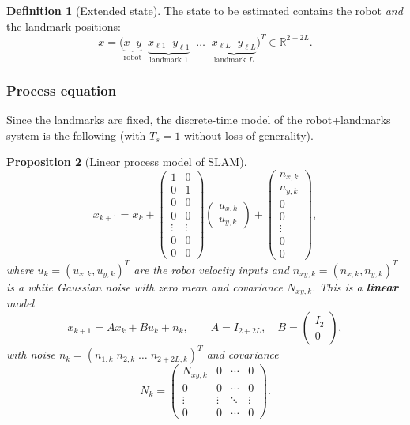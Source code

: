 \documentclass[11pt,a4paper]{article}
\def\bm#1{#1}%
\newcommand{\R}{\mathbb{R}}
\theoremstyle{definition}
\newtheorem{definition}{Definition}[section]
\theoremstyle{plain}
\newtheorem{proposition}[definition]{Proposition}
\theoremstyle{remark}
\begin{document}
\begin{definition}[Extended state]
\label{def:extstate}
The state to be estimated contains the robot \emph{and} the landmark positions:
\[
\bm x=\bigl(\underbrace{x\;\;y}_{\text{robot}}\;\;\underbrace{x_{\ell1}\;\;y_{\ell1}}_{\text{landmark }1}\;\;\dots\;\;\underbrace{x_{\ell L}\;\;y_{\ell L}}_{\text{landmark }L}\bigr)^T\in\R^{2+2L}.
\]
\end{definition}

\subsubsection*{Process equation}
Since the landmarks are fixed, the discrete-time model of the robot+landmarks system is the following (with $T_s=1$ without loss of generality).

\begin{proposition}[Linear process model of SLAM]
\label{prop:slamproc}
\[
\bm x_{k+1}=\bm x_k+
\begin{pmatrix}1&0\\0&1\\0&0\\0&0\\\vdots&\vdots\\0&0\\0&0\end{pmatrix}
\begin{pmatrix}u_{x,k}\\u_{y,k}\end{pmatrix}+
\begin{pmatrix}n_{x,k}\\n_{y,k}\\0\\0\\\vdots\\0\\0\end{pmatrix},
\]
where $\bm u_k=(u_{x,k},u_{y,k})^T$ are the robot velocity inputs and $\bm n_{xy,k}=(n_{x,k},n_{y,k})^T$ is a white Gaussian noise with zero mean and covariance $\bm N_{xy,k}$. This is a \textbf{linear} model
\[
\bm x_{k+1}=\bm A\bm x_k+\bm B\bm u_k+\bm n_k,\qquad \bm A=\bm I_{2+2L},\quad \bm B=\begin{pmatrix}\bm I_2\\\bm 0\end{pmatrix},
\]
with noise $\bm n_k=(n_{1,k}\;n_{2,k}\;\dots\;n_{2+2L,k})^T$ and covariance
\[
\bm N_k=\begin{pmatrix}\bm N_{xy,k}&\bm 0&\cdots&\bm 0\\\bm 0&\bm 0&\cdots&\bm 0\\\vdots&\vdots&\ddots&\vdots\\\bm 0&\bm 0&\cdots&\bm 0\end{pmatrix}.
\]
\end{proposition}
\end{document}
